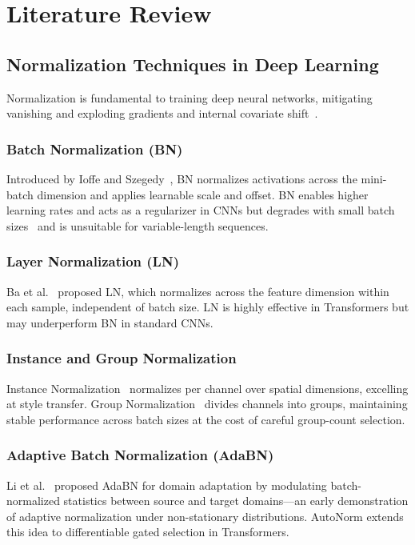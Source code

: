 \documentclass[conference]{IEEEtran}
\begin{document}
\section{Literature Review}

\subsection{Normalization Techniques in Deep Learning}

Normalization is fundamental to training deep neural networks,
mitigating vanishing and exploding gradients and internal covariate
shift~\cite{ioffe2015batch,ba2016layernorm,ulyanov2016instance,wu2018group}.

\subsubsection{Batch Normalization (BN)}
Introduced by Ioffe and Szegedy~\cite{ioffe2015batch}, BN normalizes
activations across the mini-batch dimension and applies learnable scale
and offset. BN enables higher learning rates and acts as a regularizer
in CNNs but degrades with small batch sizes~\cite{wu2018group} and is
unsuitable for variable-length sequences.

\subsubsection{Layer Normalization (LN)}
Ba et al.~\cite{ba2016layernorm} proposed LN, which normalizes across
the feature dimension within each sample, independent of batch size.
LN is highly effective in Transformers but may underperform BN in
standard CNNs.

\subsubsection{Instance and Group Normalization}
Instance Normalization~\cite{ulyanov2016instance} normalizes per
channel over spatial dimensions, excelling at style transfer. Group
Normalization~\cite{wu2018group} divides channels into groups,
maintaining stable performance across batch sizes at the cost of
careful group-count selection.

\subsubsection{Adaptive Batch Normalization (AdaBN)}
Li et al.~\cite{li2018adaptive} proposed AdaBN for domain adaptation
by modulating batch-normalized statistics between source and target
domains---an early demonstration of adaptive normalization under
non-stationary distributions. AutoNorm extends this idea to
differentiable gated selection in Transformers.
\end{document}
